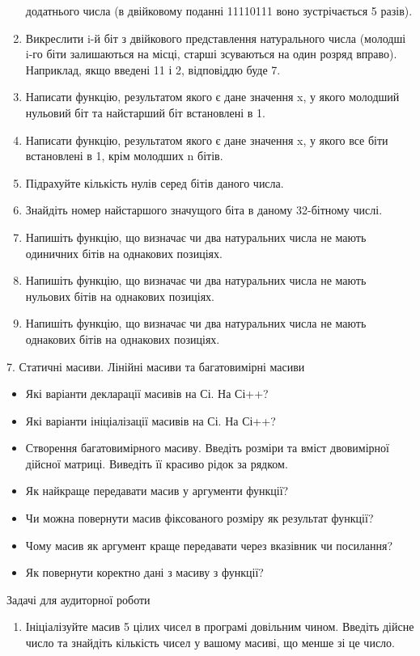 \documentclass[]{article}
\begin{document}
\begin{enumerate}
  додатнього числа (в двійковому поданні 11110111 воно зустрічається 5
  разів).
\item
  Викреслити i-й біт з двійкового представлення натурального числа
  (молодші i-го біти залишаються на місці, старші зсуваються на один
  розряд вправо). Наприклад, якщо введені 11 і 2, відповіддю буде 7.
\item
  \protect\hypertarget{_Hlk65236142}{}{} Написати функцію, результатом
  якого є дане значення x, у якого молодший нульовий біт та найстарший
  біт встановлені в 1.
\item
  Написати функцію, результатом якого є дане значення x, у якого все
  біти встановлені в 1, крім молодших n бітів.
\item
  Підрахуйте кількість нулів серед бітів даного числа.
\item
  Знайдіть номер найстаршого значущого біта в даному 32-бітному числі.
\item
  Напишіть функцію, що визначає чи два натуральних числа не мають
  одиничних бітів на однакових позиціях.
\item
  Напишіть функцію, що визначає чи два натуральних числа не мають
  нульових бітів на однакових позиціях.
\item
  Напишіть функцію, що визначає чи два натуральних числа не мають
  однакових бітів на однакових позиціях.
\end{enumerate}

7. Статичні масиви. Лінійні масиви та багатовимірні масиви

\begin{itemize}
\item
  Які варіанти декларації масивів на Сі. На Сі++?
\item
  Які варіанти ініціалізації масивів на Сі. На Сі++?
\item
  Створення багатовимірного масиву. Введіть розміри та вміст двовимірної
  дійсної матриці. Виведіть її красиво рідок за рядком.
\item
  Як найкраще передавати масив у аргументи функції?
\item
  Чи можна повернути масив фіксованого розміру як результат функції?
\item
  Чому масив як аргумент краще передавати через вказівник чи посилання?
\item
  Як повернути коректно дані з масиву з функції?
\end{itemize}

Задачі для аудиторної роботи

\begin{enumerate}
\def\labelenumi{\arabic{enumi})}
\item
  Ініціалізуйте масив 5 цілих чисел в програмі довільним чином. Введіть
  дійсне число та знайдіть кількість чисел у вашому масиві, що менше зі
  це число.
\end{enumerate}
\end{document}
